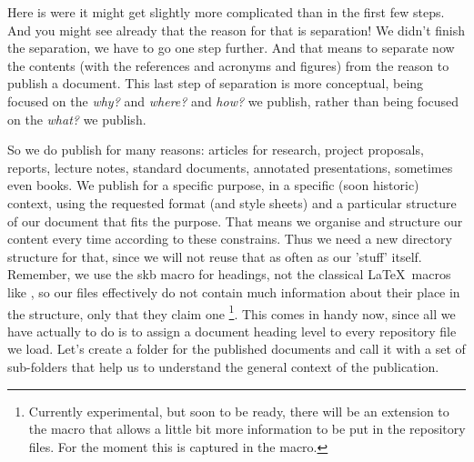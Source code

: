 
Here is were it might get slightly more complicated than in the first few 
steps. And you might see already that the reason for that is separation! 
We didn't finish the separation, we have to go one step further. And that 
means to separate now the contents (with the references and acronyms and 
figures) from the reason to publish a document. This last step of 
separation is more conceptual, being focused on the \textit{why?} and 
\textit{where?} and \textit{how?} we publish, rather than being focused on 
the \textit{what?} we publish. 

So we do publish for many reasons: articles for research, project 
proposals, reports, lecture notes, standard documents, annotated 
presentations, sometimes even books. We publish for a specific purpose, in 
a specific (soon historic) context, using the requested format (and style 
sheets) and a particular structure of our document that fits the purpose. 
That means we organise and structure our content every time according to 
these constrains. Thus we need a new directory structure for that, since 
we will not reuse that as often as our 'stuff' itself. Remember, we use 
the skb macro \cmd{\skbheading} for headings, not the classical \LaTeX~macros 
like \cmd{\section}, so our files effectively do not contain much information 
about their place in the structure, only that they claim one
\footnote{Currently experimental, but soon to be ready, there will be an extension
to the \cmd{\skbheading} macro that allows a little bit more information to be put 
in the repository files. For the moment this is captured in the \cmd{\skbheadingduc} macro.}.
This comes in handy now, since all we have actually to do is to assign a document heading 
level to every repository file we load. Let's create a folder for the published documents and 
call it  with a set of sub-folders that help us to understand the general
context of the publication.%
%

